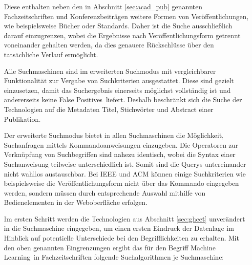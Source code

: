 Diese enthalten neben den in Abschnitt \ref{sec:acad_pub} genannten Fachzeitschriften und Konferenzbeiträgen weitere Formen von Veröffentlichungen, wie beispielsweise Bücher oder Standards. Daher ist die Suche ausschließlich darauf einzugrenzen, wobei die Ergebnisse nach Veröffentlichungsform getrennt voneinander gehalten werden, da dies genauere Rückschlüsse über den tatsächliche Verlauf ermöglicht.

Alle Suchmaschinen sind im erweiterten Suchmodus mit vergleichbarer Funktionalität zur Vergabe von Suchkriterien ausgestattet. Diese sind gezielt einzusetzen, damit das Suchergebnis einerseits möglichst vollständig ist und andererseits keine \glqq False Positives\grqq~liefert. Deshalb beschränkt sich die Suche der Technologien auf die Metadaten Titel, Stichwörter und Abstract einer Publikation.

Der erweiterte Suchmodus bietet in allen Suchmaschinen die Möglichkeit, Suchanfragen mittels Kommandoanweisungen einzugeben. Die Operatoren zur Verknüpfung von Suchbegriffen sind nahezu identisch, wobei die Syntax einer Suchanweisung teilweise unterschiedlich ist. Somit sind die Querys untereinander nicht wahllos austauschbar. Bei IEEE und ACM können einige Suchkriterien wie beispielsweise die Veröffentlichungsform nicht über das Kommando eingegeben werden, sondern müssen durch entsprechende Auswahl mithilfe von Bedienelementen in der Web\-oberfläche erfolgen.

Im ersten Schritt werden die Technologien aus Abschnitt \ref{sec:ghcet} unverändert in die Suchmaschine eingegeben, um einen ersten Eindruck der Datenlage im Hinblick auf potentielle Unterschiede bei den Begrifflichkeiten zu erhalten. Mit den oben genannten Eingrenzungen ergibt das für den Begriff \glqq Machine Learning\grqq~in Fachzeitschriften folgende Suchalgorithmen je Suchmaschine:

